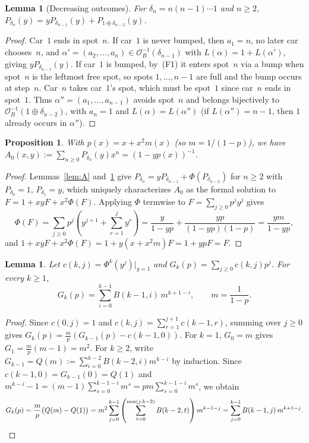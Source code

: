 \documentclass[11pt]{article}
\newtheorem{lemma}[theorem]{Lemma}
\newtheorem{proposition}[theorem]{Proposition}
\begin{document}
\begin{lemma}[Decreasing outcomes]\label{lem:B}
For $\delta_n = n(n - 1)\cdots 1$ and $n \ge 2$, $P_{\delta_n}(y) = y P_{\delta_{n-1}}(y) + P_{1 \oplus \delta_{n-2}}(y)$.
\end{lemma}

\begin{proof}
Car~$1$ ends in spot~$n$. If car~$1$ is never bumped, then $a_1 = n$, no later car chooses~$n$, and $\alpha' = (a_2, \dots, a_n) \in \mathcal{O}_B^{-1}(\delta_{n-1})$ with $L(\alpha) = 1 + L(\alpha')$, giving $y P_{\delta_{n-1}}(y)$. If car~$1$ is bumped, by~(F1) it enters spot~$n$ via a bump when spot~$n$ is the leftmost free spot, so spots $1, \dots, n - 1$ are full and the bump occurs at step~$n$. Car~$n$ takes car~$1$'s spot, which must be spot~$1$ since car~$n$ ends in spot~$1$. Thus $\alpha'' = (a_1, \dots, a_{n-1})$ avoids spot~$n$ and belongs bijectively to $\mathcal{O}_B^{-1}(1 \oplus \delta_{n-2})$, with $a_n = 1$ and $L(\alpha) = L(\alpha'')$ (if $L(\alpha'') = n - 1$, then $1$ already occurs in $\alpha''$).
\end{proof}

\begin{proposition}\label{prop:base}
With $p(x) = x + x^2 m(x)$ (so $m = 1/(1 - p)$), we have $A_0(x, y) := \sum_{n \ge 0} P_{\delta_n}(y) x^n = (1 - y p(x))^{-1}$.
\end{proposition}

\begin{proof}
Lemmas~\ref{lem:A} and~\ref{lem:B} give $P_{\delta_n} = y P_{\delta_{n-1}} + \Phi(P_{\delta_{n-2}})$ for $n \ge 2$ with $P_{\delta_0} = 1$, $P_{\delta_1} = y$, which uniquely characterizes $A_0$ as the formal solution to $F = 1 + xy F + x^2 \Phi(F)$. Applying $\Phi$ termwise to $F = \sum_{j \ge 0} p^j y^j$ gives
\[
  \Phi(F) = \sum_{j \ge 0} p^j \left(y^{j+1} + \sum_{r=1}^{j} y^r\right) = \frac{y}{1 - yp} + \frac{yp}{(1 - yp)(1 - p)} = \frac{ym}{1 - yp},
\]
and $1 + xy F + x^2 \Phi(F) = 1 + y(x + x^2 m) F = 1 + yp F = F$.
\end{proof}

\begin{lemma}\label{lem:C}
Let $c(k, j) = \Phi^k(y^j)|_{y=1}$ and $G_k(p) = \sum_{j \ge 0} c(k, j) p^j$. For every $k \ge 1$,
\[
  G_k(p) = \sum_{i=0}^{k-1} B(k - 1, i)\, m^{k + 1 - i}, \qquad m = \frac{1}{1 - p}.
\]
\end{lemma}

\begin{proof}
Since $c(0, j) = 1$ and $c(k, j) = \sum_{r=1}^{j+1} c(k - 1, r)$, summing over $j \ge 0$ gives $G_k(p) = \frac{m}{p}(G_{k-1}(p) - c(k - 1, 0))$. For $k = 1$, $G_0 = m$ gives $G_1 = \frac{m}{p}(m - 1) = m^2$. For $k \ge 2$, write $G_{k-1} = Q(m) := \sum_{i=0}^{k-2} B(k - 2, i) m^{k - i}$ by induction. Since $c(k - 1, 0) = G_{k-1}(0) = Q(1)$ and $m^{k - i} - 1 = (m - 1)\sum_{s=0}^{k - 1 - i} m^s = pm \sum_{s=0}^{k - 1 - i} m^s$, we obtain
\[
  G_k(p) = \frac{m}{p}\bigl(Q(m) - Q(1)\bigr) = m^2 \sum_{j=0}^{k-1} \left(\sum_{t=0}^{\min(j, k - 2)} B(k - 2, t)\right) m^{k - 1 - j} = \sum_{j=0}^{k-1} B(k - 1, j)\, m^{k + 1 - j}. \qedhere
\]
\end{proof}
\end{document}
